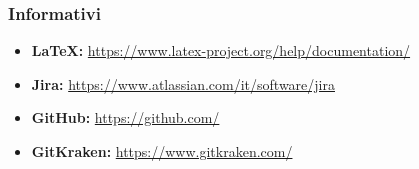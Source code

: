 \subsubsection{Informativi}
\begin{itemize}
	\item \textbf{\LaTeX:} \url{https://www.latex-project.org/help/documentation/}
	\item \textbf{Jira:} \url{https://www.atlassian.com/it/software/jira}
	\item \textbf{GitHub:} \url{https://github.com/}
	\item \textbf{GitKraken:} \url{https://www.gitkraken.com/}
\end{itemize}